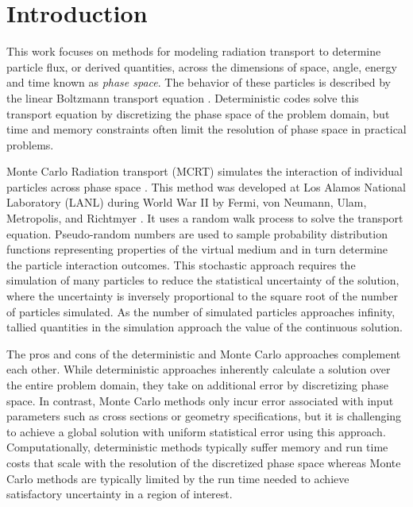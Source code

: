 \newcommand{\dagmcModel}[2] {
  \null %
  \textbf{\uppercase{#1}} 
  \begin{adjustwidth}{2.5em}{0pt}
    #2
  \end{adjustwidth}
  \null
}

\chapter{Introduction}\label{ch:introduction}

This work focuses on methods for modeling radiation transport to determine
particle flux, or derived quantities, across the dimensions of space, angle,
energy and time known as \textit{phase space}. The behavior of these particles
is described by the linear Boltzmann transport equation
\cite{Ulam_1949}. Deterministic codes solve this transport equation by
discretizing the phase space of the problem domain, but time and memory
constraints often limit the resolution of phase space in practical problems.

Monte Carlo Radiation transport (MCRT) simulates the
interaction of individual particles across phase space \cite{Lewis_1993}. This
method was developed at Los Alamos National Laboratory (LANL) during World War
II by Fermi, von Neumann, Ulam, Metropolis, and Richtmyer \cite{LANL_1987}. It
uses a random walk process to solve the transport equation. Pseudo-random
numbers are used to sample probability distribution functions representing
properties of the virtual medium and in turn determine the particle interaction
outcomes. This stochastic approach requires the simulation of many particles to
reduce the statistical uncertainty of the solution, where the uncertainty is
inversely proportional to the square root of the number of particles
simulated. As the number of simulated particles approaches infinity, tallied
quantities in the simulation approach the value of the continuous solution.

The pros and cons of the deterministic and Monte Carlo approaches complement
each other. While deterministic approaches inherently calculate a solution over
the entire problem domain, they take on additional error by discretizing phase
space. In contrast, Monte Carlo methods only incur error associated with input
parameters such as cross sections or geometry specifications, but it is
challenging to achieve a global solution with uniform statistical error using
this approach. Computationally, deterministic methods typically suffer memory
and run time costs that scale with the resolution of the discretized phase space
whereas Monte Carlo methods are typically limited by the run time needed to
achieve satisfactory uncertainty in a region of interest.


